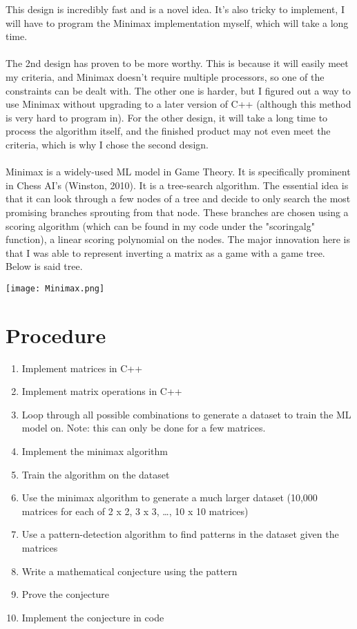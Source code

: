 \documentclass{article}
\begin{document}
This design is incredibly fast and is a novel idea. It’s also tricky to implement, I will have to program the Minimax implementation myself, which will take a long time.
\\ \\ 
The 2nd design has proven to be more worthy. This is because it will easily meet my criteria, and Minimax doesn’t require multiple processors, so one of the constraints can be dealt with. The other one is harder, but I figured out a way to use Minimax without upgrading to a later version of C++ (although this method is very hard to program in). For the other design, it will take a long time to process the algorithm itself, and the finished product may not even meet the criteria, which is why I chose the second design. 
\\ \\
Minimax is a widely-used ML model in Game Theory. It is specifically prominent in Chess AI's (Winston, 2010). It is a tree-search algorithm. The essential idea is that it can look through a few nodes of a tree and decide to only search the most promising branches sprouting from that node. These branches are chosen using a scoring algorithm (which can be found in my code under the "scoringalg" function), a linear scoring polynomial on the nodes. The major innovation here is that I was able to represent inverting a matrix as a game with a game tree. Below is said tree.
\begin{center}\texttt{[image: Minimax.png]}\end{center}
\section*{Procedure}
\begin{enumerate}
\item Implement matrices in C++
\item Implement matrix operations in C++
\item Loop through all possible combinations to generate a dataset to train       the ML model on. Note: this can only be done for a few matrices.
\item Implement the minimax algorithm
\item Train the algorithm on the dataset
\item Use the minimax algorithm to generate a much larger dataset (10,000         matrices for each of 2 x 2, 3 x 3, …, 10 x 10 matrices)
\item Use a pattern-detection algorithm to find patterns in the dataset           given the matrices
\item Write a mathematical conjecture using the pattern 
\item Prove the conjecture
\item Implement the conjecture in code
\end{enumerate}
\end{document}
